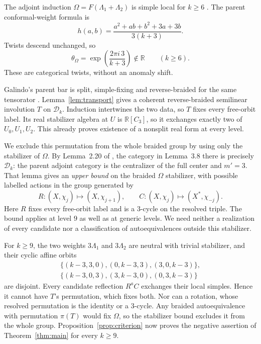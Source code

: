 \documentclass[11pt]{amsart}
\theoremstyle{remark}
\newcommand{\R}{\mathbb R}
\newcommand{\D}{\mathcal D}
\begin{document}
The adjoint induction $\Omega=F(\Lambda_1+\Lambda_2)$ is simple local
for $k\ge6$ \cite[Lemma~2.17]{Edie}. The parent conformal-weight formula is
\begin{equation}\label{eq:weight}
 h(a,b)=\frac{a^2+ab+b^2+3a+3b}{3(k+3)}.
\end{equation}
Twists descend unchanged, so
\[
 \theta_\Omega=\exp\left(\frac{2\pi i\,3}{k+3}\right)\notin\R
 \qquad(k\ge6).
\]
These are categorical twists, without an anomaly shift.

Galindo's parent bar is split, simple-fixing and reverse-braided for
the same tensorator \cite[Section~3.2--3.3, Lemma~3.23]{Galindo}.
Lemma~\ref{lem:transport} gives a coherent reverse-braided semilinear
involution $T$ on $\D_k$. Induction intertwines the two data, so $T$
fixes every free-orbit label. Its real stabilizer algebra at $U$ is
$\R[C_3]$, so it exchanges exactly two of $U_0,U_1,U_2$.
This already proves existence of a nonsplit real form at every level.

We exclude this permutation from the whole braided group by using only
the stabilizer of $\Omega$. By Lemma~2.20 of \cite{Edie}, the category
in Lemma~3.8 there is precisely $\D_k$: the parent adjoint category is
the centralizer of the full center and $m'=3$.
That lemma gives an \emph{upper bound} on the braided $\Omega$ stabilizer,
with possible labelled actions in the group generated by
\begin{equation}\label{eq:dihedral}
 R:(X,\chi_j)\longmapsto(X,\chi_{j+1}),\qquad
 C:(X,\chi_j)\longmapsto(X^*,\chi_{-j}).
\end{equation}
Here $R$ fixes every free-orbit label and is a $3$-cycle on the resolved
triple. The bound applies at level $9$ as well as at generic levels.
We need neither a realization of every candidate nor a classification
of autoequivalences outside this stabilizer.

For $k\ge9$, the two weights $3\Lambda_1$ and $3\Lambda_2$ are neutral
with trivial stabilizer, and their cyclic affine orbits
\begin{equation}\label{eq:pair}
 \begin{gathered}
 \{(k-3,3,0),(0,k-3,3),(3,0,k-3)\},\\
 \{(k-3,0,3),(3,k-3,0),(0,3,k-3)\}
 \end{gathered}
\end{equation}
are disjoint. Every candidate reflection $R^aC$ exchanges their local
simples. Hence it cannot have $T$'s permutation, which fixes both.
Nor can a rotation, whose resolved permutation is the identity or a
$3$-cycle. Any braided autoequivalence with permutation $\pi(T)$ would
fix $\Omega$, so the stabilizer bound excludes it from the whole group.
Proposition~\ref{prop:criterion} now proves the negative assertion of
Theorem~\ref{thm:main} for every $k\ge9$.
\end{document}
